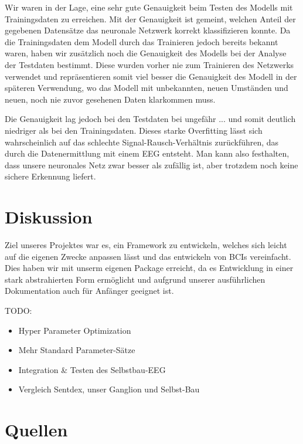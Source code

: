 \documentclass[10pt]{article}
\begin{document}
Wir waren in der Lage, eine sehr gute Genauigkeit beim Testen des Modells mit Trainingsdaten zu erreichen. 
Mit der Genauigkeit ist gemeint, welchen Anteil der gegebenen Datensätze das neuronale Netzwerk korrekt klassifizieren konnte. 
Da die Trainingsdaten dem Modell durch das Trainieren jedoch bereits bekannt waren, haben wir zusätzlich noch die Genauigkeit des Modells bei der Analyse der Testdaten bestimmt. 
Diese wurden vorher nie zum Trainieren des Netzwerks verwendet und repräsentieren somit viel besser die Genauigkeit des Modell in der späteren Verwendung, wo das Modell mit unbekannten, neuen Umständen und neuen, noch nie zuvor gesehenen Daten klarkommen muss. %

Die Genauigkeit lag jedoch bei den Testdaten bei ungefähr ... %
und somit deutlich niedriger als bei den Trainingsdaten. 
Dieses starke Overfitting lässt sich wahrscheinlich auf das schlechte Signal-Rausch-Verhältnis zurückführen, das durch die Datenermittlung mit einem EEG entsteht. Man kann also festhalten, dass unsere neuronales Netz zwar besser als zufällig ist, aber trotzdem noch keine sichere Erkennung liefert.

\section{Diskussion}

Ziel unseres Projektes war es, ein Framework zu entwickeln, welches sich leicht auf die eigenen Zwecke anpassen lässt und das entwickeln von BCIs vereinfacht. Dies haben wir mit unserm eigenen Package erreicht, da es Entwicklung in einer stark abstrahierten Form ermöglicht und aufgrund unserer ausführlichen Dokumentation auch für Anfänger geeignet ist.

TODO:
\begin{itemize}
    \item Hyper Parameter Optimization
    \item Mehr Standard Parameter-Sätze
    \item Integration \& Testen des Selbstbau-EEG
    \item Vergleich Sentdex, unser Ganglion und Selbst-Bau
\end{itemize}

\section{Quellen}
\end{document}
